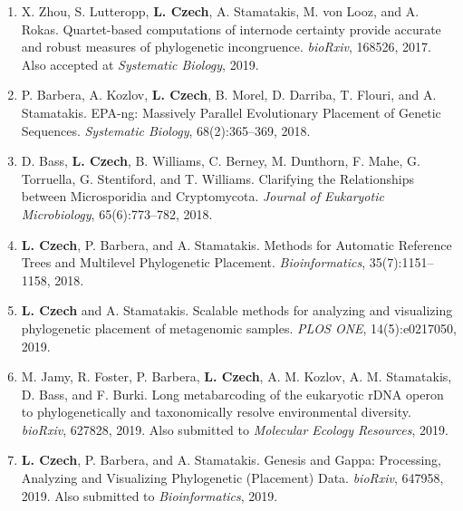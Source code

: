 \begin{enumerate}
    \item X. Zhou, S. Lutteropp, \textbf{L. Czech}, A. Stamatakis, M. von Looz, and A. Rokas.
        Quartet-based computations of internode certainty provide accurate and robust measures of phylogenetic incongruence.
        \textit{bioRxiv}, 168526, 2017. %
        Also accepted at \textit{Systematic Biology}, 2019.

    \item P. Barbera, A. Kozlov, \textbf{L. Czech}, B. Morel, D. Darriba, T. Flouri, and A. Stamatakis.
        EPA-ng: Massively Parallel Evolutionary Placement of Genetic Sequences.
        \textit{Systematic Biology}, 68(2):365--369, 2018. %

    \item D. Bass, \textbf{L. Czech}, B. Williams, C. Berney, M. Dunthorn, F. Mahe, G. Torruella, G. Stentiford, and T. Williams.
        Clarifying the Relationships between Microsporidia and Cryptomycota.
        \textit{Journal of Eukaryotic Microbiology}, 65(6):773--782, 2018. %

    \item \textbf{L. Czech}, P. Barbera, and A. Stamatakis.
        Methods for Automatic Reference Trees and Multilevel Phylogenetic Placement.
        \textit{Bioinformatics}, 35(7):1151--1158, 2018. %

    \item \textbf{L. Czech} and A. Stamatakis.
        Scalable methods for analyzing and visualizing phylogenetic placement of metagenomic samples.
        \textit{PLOS ONE}, 14(5):e0217050, 2019. %
        
    \item M. Jamy, R. Foster, P. Barbera, \textbf{L. Czech}, A. M. Kozlov, A. M. Stamatakis, D. Bass, and F. Burki.
        Long metabarcoding of the eukaryotic rDNA operon to phylogenetically and taxonomically resolve environmental diversity.
        \textit{bioRxiv}, 627828, 2019. %
        Also submitted to \textit{Molecular Ecology Resources}, 2019.

    \item \textbf{L. Czech}, P. Barbera, and A. Stamatakis.
        Genesis and Gappa: Processing, Analyzing and Visualizing Phylogenetic (Placement) Data.
        \textit{bioRxiv}, 647958, 2019. %
        Also submitted to \textit{Bioinformatics}, 2019.
    
\end{enumerate}

\clearpage
